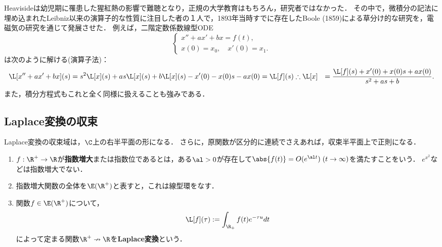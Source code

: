 \documentclass[uplatex,dvipdfmx]{jsreport}
\begin{document}
\begin{history}[Heaviside]
    Heavisideは幼児期に罹患した猩紅熱の影響で難聴となり，正規の大学教育はもちろん，研究者ではなかった．
    その中で，微積分の記法に埋め込まれたLeibniz以来の演算子的な性質に注目した者の１人で，1893年当時すでに存在したBoole (1859)による草分け的な研究を，電磁気の研究を通じて発展させた．
    例えば，二階定数係数線型ODE
    \[\begin{cases}
        x''+ax'+bx=f(t),\\
        x(0)=x_0,\quad x'(0)=x_1.
    \end{cases}\]
    は次のように解ける(演算子法)：
    \begin{align*}
        \L[x''+ax'+bx](s)&=s^2\L[x](s)+as\L[x](s)+b\L[x](s)-x'(0)-x(0)s-ax(0)=\L[f](s)
        \therefore \L[x]&=\frac{\L[f](s)+x'(0)+x(0)s+ax(0)}{s^2+as+b}.
    \end{align*}
    また，積分方程式もこれと全く同様に扱えることも強みである．
\end{history}

\subsection{Laplace変換の収束}

\begin{tcolorbox}[colframe=ForestGreen, colback=ForestGreen!10!white,breakable,colbacktitle=ForestGreen!40!white,coltitle=black,fonttitle=\bfseries\sffamily,
title=]
    Laplace変換の収束域は，$\C$上の右半平面の形になる．
    さらに，原関数が区分的に連続でさえあれば，収束半平面上で正則になる．
\end{tcolorbox}

\begin{definition}\mbox{}
    \begin{enumerate}
        \item $f:\R^+\to\R$が\textbf{指数増大}または指数位であるとは，ある$\al>0$が存在して$\abs{f(t)}=O(e^{\al t})\;(t\to\infty)$を満たすことをいう．
        $e^{x^2}$などは指数増大でない．
        \item 指数増大関数の全体を$\E(\R^+)$と表すと，これは線型環をなす．
        \item 関数$f\in\E(\R^+)$について，
        \[\L[f](\tau):=\int_{\R_+}f(t)e^{-\tau u}dt\]
        によって定まる関数$\R^+\nrightarrow\R$を\textbf{Laplace変換}という．
    \end{enumerate}
\end{definition}
\end{document}
